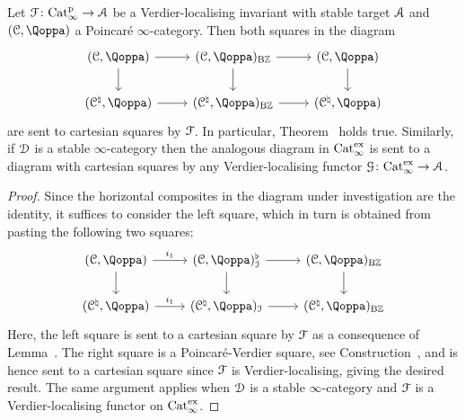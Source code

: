 \begin{corollary}
\label{corollary:S1-natural}%
Let $\mathcal{F}\colon \mathrm{Cat}^{\mathrm p}_\infty \to \mathcal{A}$ be a Verdier-localising invariant with stable target $\mathcal{A}$ and $(\C,\QF)$ a Poincar\'e $\infty$-category. Then both squares in the diagram  
\[
\begin{tikzcd}
	(\C,\QF) \ar[r]\ar[d]  & (\C,\QF)_{\B\ZZ} \ar[d]\ar[r] & (\C,\QF) \ar[d] \\
	(\C^\natural,\QF) \ar[r] & (\C^\natural,\QF)_{\B\ZZ} \ar[r] & (\C^\natural,\QF)
\end{tikzcd}
\]
are sent to cartesian squares by $\mathcal{F}$. In particular, Theorem~\; holds true.
Similarly, if $\mathcal{D}$ is a stable $\infty$-category then the analogous diagram in $\mathrm{Cat}_\infty^{\mathrm{ex}}$ is sent to a diagram with cartesian squares by any Verdier-localising functor $\mathcal{G}\colon \mathrm{Cat}_\infty^{\mathrm{ex}} \to \mathcal{A}$.
\end{corollary}
\begin{proof}%



Since the horizontal composites in the diagram under investigation are the identity, it suffices to consider the left square, which in turn is obtained from pasting the following two squares:
\[
\begin{tikzcd}
	(\C,\QF) \ar[r,"i_1"] \ar[d] & (\C,\QF)^{\flat}_\I \ar[r] \ar[d] & (\C,\QF)_{\B\ZZ} \ar[d] \\
	(\C^\natural,\QF) \ar[r,"i_1"] & (\C^\natural,\QF)_\I \ar[r] & (\C^\natural,\QF)_{\B\ZZ}  
\end{tikzcd}
\]
Here, the left square 
is sent to a cartesian square by $\mathcal{F}$ as a consequence of Lemma~. The right square is a Poincaré-Verdier square, see Construction~, and is hence sent to a cartesian square since $\mathcal{F}$ is Verdier-localising, giving the desired result. The same argument applies when $\mathcal{D}$ is a stable $\infty$-category and $\mathcal{F}$ is a Verdier-localising functor on $\mathrm{Cat}_\infty^{\mathrm{ex}}$.
\end{proof}


